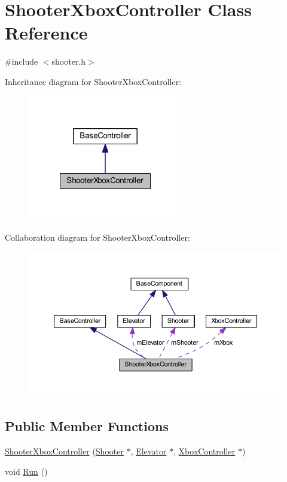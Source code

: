 \hypertarget{class_shooter_xbox_controller}{\section{\-Shooter\-Xbox\-Controller \-Class \-Reference}
\label{class_shooter_xbox_controller}
}


{\ttfamily \#include $<$shooter.\-h$>$}



\-Inheritance diagram for \-Shooter\-Xbox\-Controller\-:\nopagebreak
\begin{figure}[H]
\begin{center}
\leavevmode
\includegraphics[width=192pt]{class_shooter_xbox_controller__inherit__graph}
\end{center}
\end{figure}


\-Collaboration diagram for \-Shooter\-Xbox\-Controller\-:\nopagebreak
\begin{figure}[H]
\begin{center}
\leavevmode
\includegraphics[width=350pt]{class_shooter_xbox_controller__coll__graph}
\end{center}
\end{figure}
\subsection*{\-Public \-Member \-Functions}
\begin{DoxyCompactItemize}
\item 
\hyperlink{class_shooter_xbox_controller_a3e2a63d4187cf21e28c92ea876001b8c}{\-Shooter\-Xbox\-Controller} (\hyperlink{class_shooter}{\-Shooter} $\ast$, \hyperlink{class_elevator}{\-Elevator} $\ast$, \hyperlink{class_xbox_controller}{\-Xbox\-Controller} $\ast$)
\item 
void \hyperlink{class_shooter_xbox_controller_a3fc1fe753943f440f09b344464e701c2}{\-Run} ()
\end{DoxyCompactItemize}
